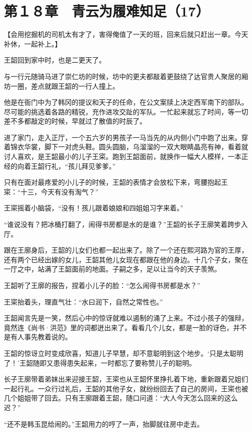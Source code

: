 \section{第１８章　青云为履难知足（17）}

【会用挖掘机的司机太有才了，害得俺值了一天的班，回来后就只赶出一章。今天补休，一起补上。】

王韶回到家中时，也是二更天了。

与一行元随骑马进了崇仁坊的时候，坊中的更夫都敲着更鼓绕了达官贵人聚居的厢坊一圈，差点就跟王韶的一行人撞上。

他是在衙门中为了韩冈的提议和天子的任命，在公文案牍上决定西军南下的部队。尽可能的挑选着各路的精锐，充作进攻交趾的军队。一忙起来就忘了时间，等一切差不多都敲定的时候，早就过了散值的时辰了。

进了家门，走入正厅，一个五六岁的男孩子一马当先的从内侧小门中跑了出来。穿着锦衣华裳，脚下一对虎头鞋。圆头圆脑，乌溜溜的一双大眼睛晶亮有神，看着就讨人喜欢，是王韶最小的儿子王寀。跑到王韶面前，就换作一幅大人模样，一本正经的向着王韶行礼，“孩儿拜见爹爹。”

只有在面对最疼爱的小儿子的时候，王韶的表情才会放松下来，弯腰抱起王寀：“十三，今天有没有淘气？”

王寀摇着小脑袋，“没有！孩儿跟着娘娘和四姐姐习字来着。”

“谁说没有？把冰桶打翻了，闹得书房都是水的是谁？”王韶的长子王廓笑着跨步入厅。

跟在王廓身后，王韶的儿女们也都一起出来了。除了一个还在熙河路为官的王厚，还有两个已经出嫁的女儿，王韶其他儿女现在都跟在他的身边。十几个子女，聚在一厅之中，站满了王韶面前的地面。子嗣之多，足以让当今的天子羡煞。

王韶听了王廓的报告，捏着小儿子的脸：“怎么闹得书房都是水？”

王寀抬着头，理直气壮：“水曰润下，自然之常性也。”

王韶闻言先是一笑，然后心中的惊讶就难以遏制的涌了上来。不过小孩子的强辩，竟然连《尚书·洪范》里的词都迸出来了。看看几个儿女，都是一脸的讶色，并不是有人事先教着说的。

王韶的惊讶立时变成欣喜，知道儿子早慧，却不意聪明到这个地步。‘只是太聪明了！’王韶随即又患得患失起来，一时都忘了要称赞儿子的聪明。

长子王廓带着弟妹出来迎接王韶，王寀也从王韶怀里挣扎着下地，重新跟着兄姐们一起行礼。一众行过礼后，王韶的其他子女，就纷纷回去了自己的房间，王寀也被几个姐姐带了回去。只有王廓跟着王韶，随口问道：“大人今天怎么回来的这么迟？”

“还不是韩玉昆给闹的。”王韶用力的哼了一声，抬脚就往房中走去。

